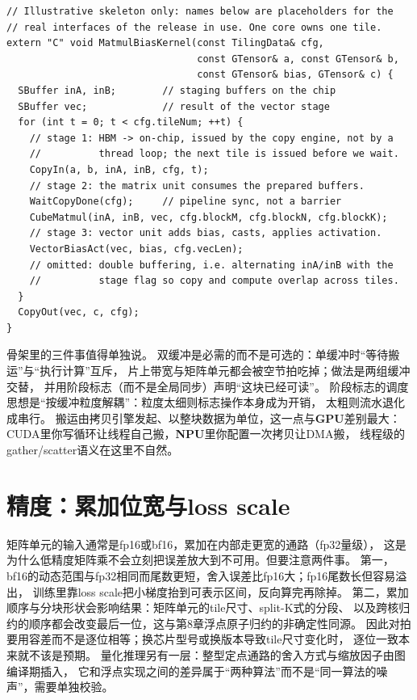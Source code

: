 \documentclass[12pt,a4paper,fontset=fandol]{ctexbook}
\newcommand{\Dom}[1]{\textsf{\bfseries #1}}
\newcommand{\GPU}{\Dom{GPU}}
\newcommand{\NPU}{\Dom{NPU}}
\begin{document}
\begin{lstlisting}[style=cppstyle,caption={自定义算子的示意骨架：接口名以所用CANN版本为准}]
// Illustrative skeleton only: names below are placeholders for the
// real interfaces of the release in use. One core owns one tile.
extern "C" void MatmulBiasKernel(const TilingData& cfg,
                                 const GTensor& a, const GTensor& b,
                                 const GTensor& bias, GTensor& c) {
  SBuffer inA, inB;        // staging buffers on the chip
  SBuffer vec;             // result of the vector stage
  for (int t = 0; t < cfg.tileNum; ++t) {
    // stage 1: HBM -> on-chip, issued by the copy engine, not by a
    //          thread loop; the next tile is issued before we wait.
    CopyIn(a, b, inA, inB, cfg, t);
    // stage 2: the matrix unit consumes the prepared buffers.
    WaitCopyDone(cfg);     // pipeline sync, not a barrier
    CubeMatmul(inA, inB, vec, cfg.blockM, cfg.blockN, cfg.blockK);
    // stage 3: vector unit adds bias, casts, applies activation.
    VectorBiasAct(vec, bias, cfg.vecLen);
    // omitted: double buffering, i.e. alternating inA/inB with the
    //          stage flag so copy and compute overlap across tiles.
  }
  CopyOut(vec, c, cfg);
}
\end{lstlisting}

骨架里的三件事值得单独说。
双缓冲是必需的而不是可选的：单缓冲时``等待搬运''与``执行计算''互斥，
片上带宽与矩阵单元都会被空节拍吃掉；做法是两组缓冲交替，
并用阶段标志（而不是全局同步）声明``这块已经可读''。
阶段标志的调度思想是``按缓冲粒度解耦''：粒度太细则标志操作本身成为开销，
太粗则流水退化成串行。
搬运由拷贝引擎发起、以整块数据为单位，这一点与\GPU{}差别最大：
CUDA里你写循环让线程自己搬，\NPU{}里你配置一次拷贝让DMA搬，
线程级的gather/scatter语义在这里不自然。

\section{精度：累加位宽与loss scale}

矩阵单元的输入通常是fp16或bf16，累加在内部走更宽的通路（fp32量级），
这是为什么低精度矩阵乘不会立刻把误差放大到不可用。但要注意两件事。
第一，bf16的动态范围与fp32相同而尾数更短，舍入误差比fp16大；fp16尾数长但容易溢出，
训练里靠loss scale把小梯度抬到可表示区间，反向算完再除掉。
第二，累加顺序与分块形状会影响结果：矩阵单元的tile尺寸、split-K式的分段、
以及跨核归约的顺序都会改变最后一位，这与第8章浮点原子归约的非确定性同源。
因此对拍要用容差而不是逐位相等；换芯片型号或换版本导致tile尺寸变化时，
逐位一致本来就不该是预期。
量化推理另有一层：整型定点通路的舍入方式与缩放因子由图编译期插入，
它和浮点实现之间的差异属于``两种算法''而不是``同一算法的噪声''，需要单独校验。
\end{document}
